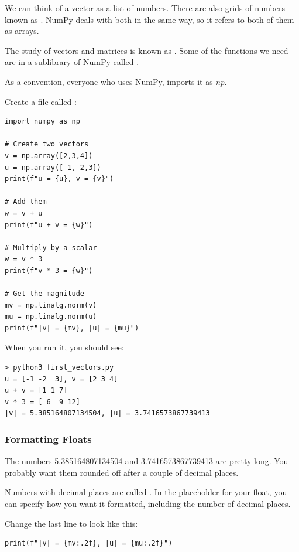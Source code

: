 We can think of a vector as a list of numbers.  
There are also grids of numbers known as . NumPy deals with 
both in the same way, so it refers to both of them as arrays.

The study of vectors and matrices is known as . Some 
of the functions we need are in a sublibrary of NumPy called . 

As a convention, everyone who uses NumPy, imports it as \textit{np}. 

Create a file called :

\begin{verbatim}
import numpy as np

# Create two vectors
v = np.array([2,3,4])
u = np.array([-1,-2,3])
print(f"u = {u}, v = {v}")

# Add them
w = v + u
print(f"u + v = {w}")

# Multiply by a scalar
w = v * 3
print(f"v * 3 = {w}")

# Get the magnitude
mv = np.linalg.norm(v)
mu = np.linalg.norm(u)
print(f"|v| = {mv}, |u| = {mu}")
\end{verbatim}

When you run it, you should see:

\begin{verbatim}
> python3 first_vectors.py
u = [-1 -2  3], v = [2 3 4]
u + v = [1 1 7]
v * 3 = [ 6  9 12]
|v| = 5.385164807134504, |u| = 3.7416573867739413
\end{verbatim}

\subsubsection{Formatting Floats}

The numbers 5.385164807134504 and 3.7416573867739413 are pretty long. You 
probably want them rounded off after a couple of decimal places.

Numbers with decimal places are called . In the placeholder 
for your float, you can specify how you want it formatted, including the 
number of decimal places.

Change the last line to look like this:
\begin{verbatim}
print(f"|v| = {mv:.2f}, |u| = {mu:.2f}")
\end{verbatim}


